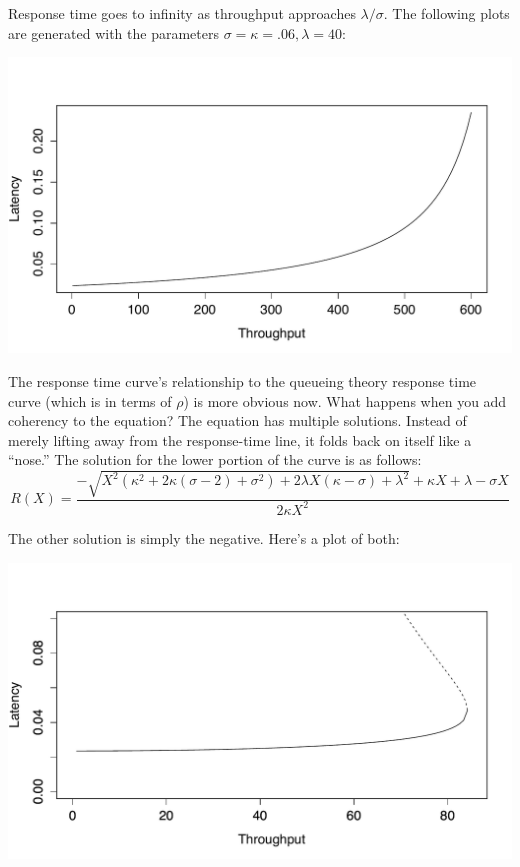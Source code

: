 \documentclass{vivid_layout}
\begin{document}
Response time goes to infinity as throughput approaches $\lambda/\sigma$. The
following plots are generated with the parameters $\sigma=\kappa=.06,
\lambda=40$:
\begin{center}
\includegraphics[width=.85\linewidth]{scalability/r-function-x-amdahl}
\end{center}

The response time curve's relationship to the queueing theory response time
curve (which is in terms of $\rho$) is more obvious now. What happens when you
add coherency to the equation? The equation has multiple solutions.  Instead of
merely lifting away from the response-time line, it folds back on itself like a
``nose.'' The solution for the lower portion of the curve is as follows:
\begin{equation}
R(X)=\frac{-\sqrt{X^2(\kappa^2+2\kappa(\sigma-2) + \sigma^2)+2\lambda X(\kappa-\sigma)+\lambda^2}+\kappa X+\lambda-\sigma X}{2\kappa X^2}
\label{r_x_lower}
\end{equation}

The other solution is simply the negative. Here's a plot of both:
\begin{center}
\includegraphics[width=.85\linewidth]{scalability/nose-equation}
\end{center}
\end{document}
